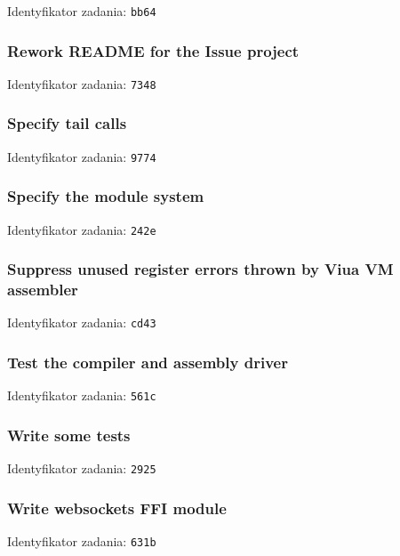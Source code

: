 Identyfikator zadania: \texttt{bb64}

\subsubsection{Rework README for the Issue project}

Identyfikator zadania: \texttt{7348}

\subsubsection{Specify tail calls}

Identyfikator zadania: \texttt{9774}

\subsubsection{Specify the module system}

Identyfikator zadania: \texttt{242e}

\subsubsection{Suppress unused register errors thrown by Viua VM assembler}

Identyfikator zadania: \texttt{cd43}

\subsubsection{Test the compiler and assembly driver}

Identyfikator zadania: \texttt{561c}

\subsubsection{Write some tests}

Identyfikator zadania: \texttt{2925}

\subsubsection{Write websockets FFI module}

Identyfikator zadania: \texttt{631b}
